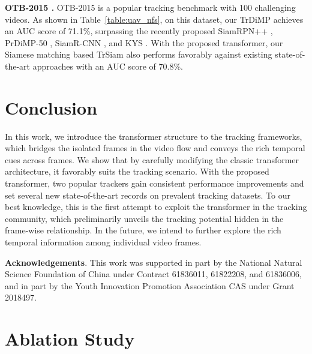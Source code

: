 \documentclass[10pt,twocolumn,letterpaper]{article}
\begin{document}
{\noindent \bf OTB-2015 \cite{OTB-2015}.} 
OTB-2015 is a popular tracking benchmark with 100 challenging videos.
As shown in Table~\ref{table:uav_nfs}, on this dataset, our TrDiMP achieves an AUC score of 71.1\%, surpassing the recently proposed SiamRPN++ \cite{siamrpn++}, PrDiMP-50 \cite{PrDiMP}, SiamR-CNN \cite{SiamRCNN}, and KYS \cite{KYS}. 
With the proposed transformer, our Siamese matching based TrSiam also performs favorably against existing state-of-the-art approaches with an AUC score of 70.8\%.






\section{Conclusion}
In this work, we introduce the transformer structure to the tracking frameworks, which bridges the isolated frames in the video flow and conveys the rich temporal cues across frames.
We show that by carefully modifying the classic transformer architecture, it favorably suits the tracking scenario.
With the proposed transformer, two popular trackers gain consistent performance improvements and set several new state-of-the-art records on prevalent tracking datasets.
To our best knowledge, this is the first attempt to exploit the transformer in the tracking community, which preliminarily unveils the tracking potential hidden in the frame-wise relationship.
In the future, we intend to further explore the rich temporal information among individual video frames.




\footnotesize {\flushleft \bf Acknowledgements}. This work was supported in part by the National Natural Science Foundation of China under Contract 61836011, 61822208, and 61836006, and in part by the Youth Innovation Promotion Association CAS under Grant 2018497.



{\small


}



\newpage

\appendix
\renewcommand{\appendixname}{Appendix~\Alph{section}}


\normalsize


\section{Ablation Study}
\end{document}
